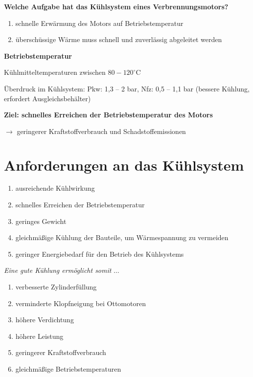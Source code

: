 \textbf{Welche Aufgabe hat das Kühlsystem eines Verbrennungsmotors?}

\begin{enumerate}
\item
  schnelle Erwärmung des Motors auf Betriebstemperatur
\item
  überschüssige Wärme muss schnell und zuverlässig abgeleitet werden
\end{enumerate}

\textbf{Betriebstemperatur}

Kühlmitteltemperaturen zwischen $80 - 120^\circ\text{C}$

Überdruck im Kühlsystem: Pkw: 1,3 -- 2 bar, Nfz: 0,5 -- 1,1 bar (bessere
Kühlung, erfordert Ausgleichsbehälter)

\textbf{Ziel: schnelles Erreichen der Betriebstemperatur des Motors}

$\to$ geringerer Kraftstoffverbrauch und Schadstoffemissionen

\section{Anforderungen an das
Kühlsystem}\label{anforderungen-an-das-kuehlsystem}

\begin{enumerate}
\item
  ausreichende Kühlwirkung
\item
  schnelles Erreichen der Betriebstemperatur
\item
  geringes Gewicht
\item
  gleichmäßige Kühlung der Bauteile, um Wärmespannung zu vermeiden
\item
  geringer Energiebedarf für den Betrieb des Kühlsystems
\end{enumerate}

\emph{Eine gute Kühlung ermöglicht somit} $\dots$

\begin{enumerate}
\item
  verbesserte Zylinderfüllung
\item
  verminderte Klopfneigung bei Ottomotoren
\item
  höhere Verdichtung
\item
  höhere Leistung
\item
  geringerer Kraftstoffverbrauch
\item
  gleichmäßige Betriebstemperaturen
\end{enumerate}

